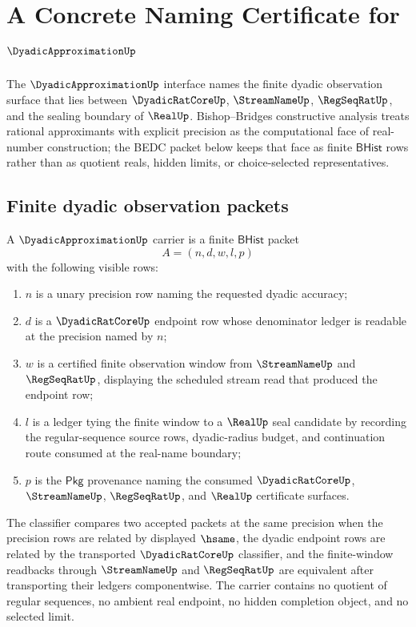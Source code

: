 \chapter{A Concrete Naming Certificate for $\DyadicApproximationUp$}
\label{ch:concrete-instances-dyadicapproximation-namecert}

The $\DyadicApproximationUp$ interface names the finite dyadic observation surface that lies between $\DyadicRatCoreUp$, $\StreamNameUp$, $\RegSeqRatUp$, and the sealing boundary of $\RealUp$. Bishop--Bridges constructive analysis treats rational approximants with explicit precision as the computational face of real-number construction; the BEDC packet below keeps that face as finite $\mathsf{BHist}$ rows rather than as quotient reals, hidden limits, or choice-selected representatives.

\section{Finite dyadic observation packets}
\label{sec:dyadicapproximation-finite-packets}

\begin{definition}
\label{def:dyadic-approximation-carrier}
A $\DyadicApproximationUp$ carrier is a finite $\mathsf{BHist}$ packet
$$
A=(n,d,w,l,p)
$$
with the following visible rows:
\begin{enumerate}
\item $n$ is a unary precision row naming the requested dyadic accuracy;
\item $d$ is a $\DyadicRatCoreUp$ endpoint row whose denominator ledger is readable at the precision named by $n$;
\item $w$ is a certified finite observation window from $\StreamNameUp$ and $\RegSeqRatUp$, displaying the scheduled stream read that produced the endpoint row;
\item $l$ is a ledger tying the finite window to a $\RealUp$ seal candidate by recording the regular-sequence source rows, dyadic-radius budget, and continuation route consumed at the real-name boundary;
\item $p$ is the $\mathsf{Pkg}$ provenance naming the consumed $\DyadicRatCoreUp$, $\StreamNameUp$, $\RegSeqRatUp$, and $\RealUp$ certificate surfaces.
\end{enumerate}
The classifier compares two accepted packets at the same precision when the precision rows are related by displayed $\hsame$, the dyadic endpoint rows are related by the transported $\DyadicRatCoreUp$ classifier, and the finite-window readbacks through $\StreamNameUp$ and $\RegSeqRatUp$ are equivalent after transporting their ledgers componentwise. The carrier contains no quotient of regular sequences, no ambient real endpoint, no hidden completion object, and no selected limit.
\end{definition}

